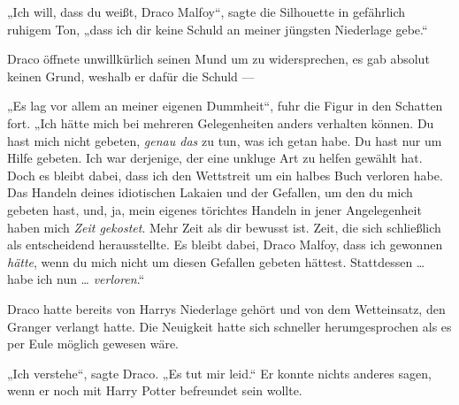 „Ich will, dass du weißt, Draco Malfoy“, sagte die Silhouette in gefährlich ruhigem Ton, „dass ich dir keine Schuld an meiner jüngsten Niederlage gebe.“

Draco öffnete unwillkürlich seinen Mund um zu widersprechen, es gab absolut keinen Grund, weshalb er dafür die Schuld —

„Es lag vor allem an meiner eigenen Dummheit“, fuhr die Figur in den Schatten fort.
„Ich hätte mich bei mehreren Gelegenheiten anders verhalten können. Du hast mich nicht gebeten, \emph{genau das} zu tun, was ich getan habe. Du hast nur um Hilfe gebeten. Ich war derjenige, der eine unkluge Art zu helfen gewählt hat. Doch es bleibt dabei, dass ich den Wettstreit um ein halbes Buch verloren habe. Das Handeln deines idiotischen Lakaien und der Gefallen, um den du mich gebeten hast, und, ja, mein eigenes törichtes Handeln in jener Angelegenheit haben mich \emph{Zeit gekostet}. Mehr Zeit als dir bewusst ist. Zeit, die sich schließlich als entscheidend herausstellte. Es bleibt dabei, Draco Malfoy, dass ich gewonnen \emph{hätte}, wenn du mich nicht um diesen Gefallen gebeten hättest. Stattdessen … habe ich nun … \emph{verloren}.“

Draco hatte bereits von Harrys Niederlage gehört und von dem Wetteinsatz, den Granger verlangt hatte. Die Neuigkeit hatte sich schneller herumgesprochen als es per Eule möglich gewesen wäre.

„Ich verstehe“, sagte Draco.
„Es tut mir leid.“ Er konnte nichts anderes sagen, wenn er noch mit Harry Potter befreundet sein wollte.

